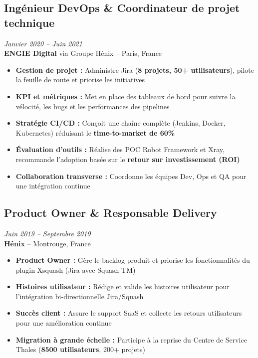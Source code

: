 \documentclass[11pt,a4paper]{article}
\newcommand{\highlight}[1]{\textcolor{primaryblue}{\textbf{#1}}}
\newcommand{\keypoint}[1]{\textbf{#1}}
\begin{document}
\subsection*{Ingénieur DevOps \& Coordinateur de projet technique} \hfill \textit{\color{mediumgray}Janvier 2020 -- Juin 2021}\\
\textcolor{primaryblue}{\textbf{ENGIE Digital}} via Groupe Hénix -- Paris, France
\begin{itemize}[leftmargin=22pt]
    \item \highlight{Gestion de projet :} Administre Jira (\keypoint{8 projets, 50+ utilisateurs}), pilote la feuille de route et priorise les initiatives
    \item \highlight{KPI et métriques :} Met en place des tableaux de bord pour suivre la vélocité, les bugs et les performances des pipelines
    \item \highlight{Stratégie CI/CD :} Conçoit une chaîne complète (Jenkins, Docker, Kubernetes) réduisant le \keypoint{time-to-market de 60\%}
    \item \highlight{Évaluation d'outils :} Réalise des POC Robot Framework et Xray, recommande l'adoption basée sur le \highlight{retour sur investissement (ROI)}
    \item \highlight{Collaboration transverse :} Coordonne les équipes Dev, Ops et QA pour une intégration continue
\end{itemize}

\subsection*{Product Owner \& Responsable Delivery} \hfill \textit{\color{mediumgray}Juin 2019 -- Septembre 2019}\\
\textcolor{primaryblue}{\textbf{Hénix}} -- Montrouge, France
\begin{itemize}[leftmargin=22pt]
    \item \highlight{Product Owner :} Gère le backlog produit et priorise les fonctionnalités du plugin Xsquash (Jira avec Squash TM)
    \item \highlight{Histoires utilisateur :} Rédige et valide les histoires utilisateur pour l'intégration bi-directionnelle Jira/Squash
    \item \highlight{Succès client :} Assure le support SaaS et collecte les retours utilisateurs pour une amélioration continue
    \item \highlight{Migration à grande échelle :} Participe à la reprise du Centre de Service Thales (\keypoint{8500 utilisateurs}, 200+ projets)
\end{itemize}
\end{document}

